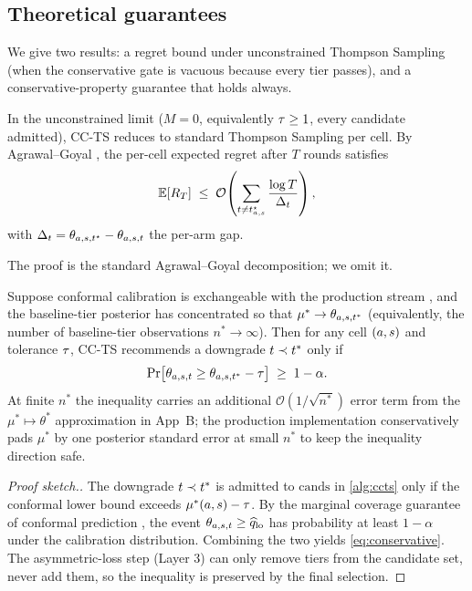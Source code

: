 \subsection{Theoretical guarantees}

We give two results: a regret bound under unconstrained Thompson Sampling
(when the conservative gate is vacuous because every tier passes), and a
conservative-property guarantee that holds always.

\begin{proposition}
\label{prop:regret}
In the unconstrained limit ($M = 0$, equivalently $\tau \geq 1$, every
candidate admitted), CC-TS reduces to standard Thompson Sampling per cell.
By Agrawal--Goyal \cite{agrawal2012analysis}, the per-cell expected regret
after $T$ rounds satisfies
\begin{equation}
  \mathbb{E}[R_T] \;\leq\; \mathcal{O}\!\left(
    \sum_{t \neq t^\star_{a,s}}
      \frac{\log T}{\Delta_t}
  \right),
  \label{eq:regret}
\end{equation}
with $\Delta_t = \theta_{a,s,t^\star} - \theta_{a,s,t}$
the per-arm gap.
\end{proposition}

The proof is the standard Agrawal--Goyal decomposition; we omit it.

\begin{theorem}
\label{thm:conservative}
Suppose conformal calibration is exchangeable with the production stream
\cite{vovk2005algorithmic}, and the baseline-tier posterior has
concentrated so that $\mu^* \to \theta_{a,s,t^*}$
(equivalently, the number of baseline-tier observations $n^* \to \infty$).
Then for any cell $(a, s)$ and tolerance $\tau$, CC-TS
recommends a downgrade $t \prec t^*$ only if
\begin{equation}
  \Pr\!\big[
    \theta_{a,s,t} \geq \theta_{a,s,t^*} - \tau
  \big]
  \;\geq\;
  1 - \alpha.
  \label{eq:conservative}
\end{equation}
At finite $n^*$ the inequality carries an additional
$\mathcal{O}(1/\sqrt{n^*})$ error term from the
$\mu^* \mapsto \theta^*$ approximation in App~B; the production
implementation conservatively pads $\mu^*$ by one posterior standard
error at small $n^*$ to keep the inequality direction safe.
\end{theorem}

\begin{proof}[Proof sketch.]
The downgrade $t \prec t^*$ is admitted to $\mathrm{cands}$ in
\cref{alg:ccts} only if the conformal lower bound exceeds
$\mu^*(a, s) - \tau$. By the marginal coverage guarantee of
conformal prediction \cite{angelopoulos2021gentle}, the event
$\theta_{a,s,t} \geq \widehat{q}_{\mathrm{lo}}$ has probability
at least $1 - \alpha$ under the calibration distribution. Combining the two
yields \cref{eq:conservative}. The asymmetric-loss step (Layer 3) can only
remove tiers from the candidate set, never add them, so the inequality is
preserved by the final selection.
\end{proof}

